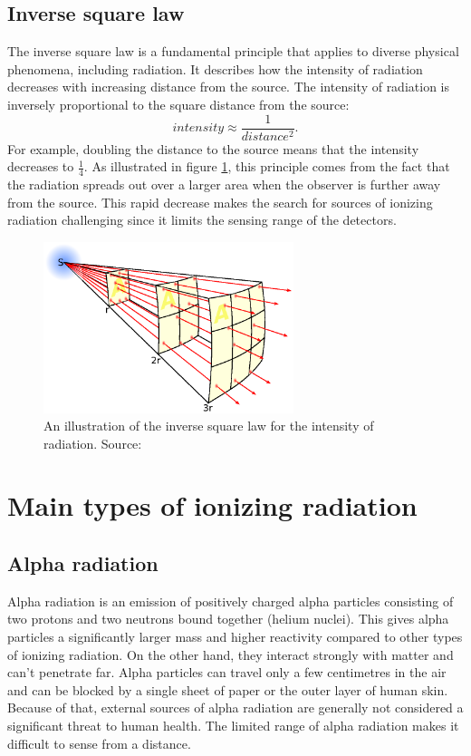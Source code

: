 \subsection{Inverse square law}%
The inverse square law is a fundamental principle that applies to diverse physical phenomena, including radiation.
It describes how the intensity of radiation decreases with increasing distance from the source.
The intensity of radiation is inversely proportional to the square distance from the source:
\begin{equation}
  intensity \approx \frac{1}{distance^2}.
\end{equation}
For example, doubling the distance to the source means that the intensity decreases to $\frac{1}{4}$.
As illustrated in figure \ref{fig:islaw}, this principle comes from the fact that the radiation spreads out over a larger area when the observer is further away from the source.
This rapid decrease makes the search for sources of ionizing radiation challenging since it limits the sensing range of the detectors.

  \begin{figure}[!h]
    \centering
      \includegraphics[width=0.65\textwidth]{./fig/photos/Inverse_square_law.eps}
    \caption{An illustration of the inverse square law for the intensity of radiation. Source: \cite{inverse_square_law}}
      \label{fig:islaw}
  \end{figure}

\section{Main types of ionizing radiation}
\subsection{Alpha radiation}
Alpha radiation is an emission of positively charged alpha particles consisting of two protons and two neutrons bound together (helium nuclei).
This gives alpha particles a significantly larger mass and higher reactivity compared to other types of ionizing radiation.
On the other hand, they interact strongly with matter and can't penetrate far.
Alpha particles can travel only a few centimetres in the air and can be blocked by a single sheet of paper or the outer layer of human skin.
Because of that, external sources of alpha radiation are generally not considered a significant threat to human health.
The limited range of alpha radiation makes it difficult to sense from a distance.

